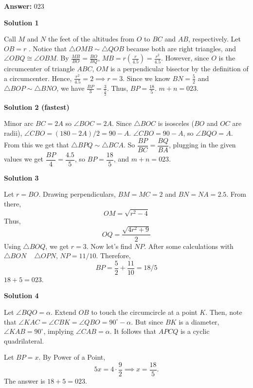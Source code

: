 \begin{enumerate}
 
 \textbf{Answer: }023



\textbf{Solution 1}

Call $M$ and $N$ the feet of the altitudes from $O$ to $BC$ and $AB$, respectively. Let $OB = r$ . Notice that $\triangle{OMB} \sim \triangle{QOB}$ because both are right triangles, and $\angle{OBQ} \cong \angle{OBM}$. By $\frac{MB}{BO}=\frac{BO}{BQ}$, $MB = r\left(\frac{r}{4.5}\right) = \frac{r^2}{4.5}$. However, since $O$ is the circumcenter of triangle $ABC$, $OM$ is a perpendicular bisector by the definition of a circumcenter. Hence, $\frac{r^2}{4.5} = 2 \implies r = 3$. Since we know $BN=\frac{5}{2}$ and $\triangle BOP \sim \triangle BNO$, we have $\frac{BP}{3} = \frac{3}{\frac{5}{2}}$. Thus, $BP = \frac{18}{5}$.  $m + n=\boxed{023}$.

 



\textbf{Solution 2 (fastest)}

Minor arc $BC = 2A$ so $\angle{BOC}=2A$. Since $\triangle{BOC}$ is isosceles ($BO$ and $OC$ are radii), $\angle{CBO}=(180-2A)/2=90-A$. $\angle{CBO}=90-A$, so $\angle{BQO}=A$. From this we get that $\triangle{BPQ}\sim \triangle{BCA}$. So $\dfrac{BP}{BC}=\dfrac{BQ}{BA}$, plugging in the given values we get $\dfrac{BP}{4}=\dfrac{4.5}{5}$, so $BP=\dfrac{18}{5}$, and $m+n=\boxed{023}$.

 



\textbf{Solution 3}

Let $r=BO$. Drawing perpendiculars, $BM=MC=2$ and $BN=NA=2.5$. From there, 
 \[OM=\sqrt{r^2-4}\] Thus, 
 \[OQ=\frac{\sqrt{4r^2+9}}{2}\] Using $\triangle{BOQ}$, we get $r=3$. Now let's find $NP$. After some calculations with $\triangle{BON}$ ~ $\triangle{OPN}$, ${NP=11/10}$. Therefore, 
 \[BP=\frac{5}{2}+\frac{11}{10}=18/5\] $18+5=\boxed{023}$.

 



\textbf{Solution 4}

Let $\angle{BQO}=\alpha$. Extend $OB$ to touch the circumcircle at a point $K$. Then, note that $\angle{KAC}=\angle{CBK}=\angle{QBO}=90^\circ-\alpha$. But since $BK$ is a diameter, $\angle{KAB}=90^\circ$, implying $\angle{CAB}=\alpha$. It follows that $APCQ$ is a cyclic quadrilateral.

 Let $BP=x$. By Power of a Point, 
 \[5x=4\cdot\frac 9 2\implies x=\frac{18}{5}.\]The answer is $18+5=\boxed{023}$.


\end{enumerate}
